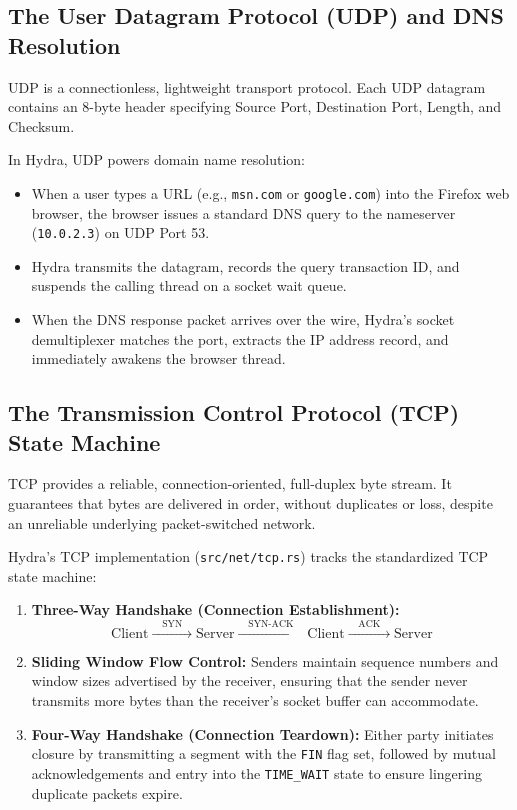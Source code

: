 \subsection{The User Datagram Protocol (UDP) and DNS Resolution}
UDP is a connectionless, lightweight transport protocol. Each UDP datagram contains an 8-byte header specifying Source Port, Destination Port, Length, and Checksum.

In Hydra, UDP powers domain name resolution:
\begin{itemize}
    \item When a user types a URL (e.g., \texttt{msn.com} or \texttt{google.com}) into the Firefox web browser, the browser issues a standard DNS query to the nameserver (\texttt{10.0.2.3}) on UDP Port 53.
    \item Hydra transmits the datagram, records the query transaction ID, and suspends the calling thread on a socket wait queue.
    \item When the DNS response packet arrives over the wire, Hydra's socket demultiplexer matches the port, extracts the IP address record, and immediately awakens the browser thread.
\end{itemize}

\subsection{The Transmission Control Protocol (TCP) State Machine}
TCP provides a reliable, connection-oriented, full-duplex byte stream. It guarantees that bytes are delivered in order, without duplicates or loss, despite an unreliable underlying packet-switched network.

Hydra's TCP implementation (\texttt{src/net/tcp.rs}) tracks the standardized TCP state machine:
\begin{enumerate}
    \item \textbf{Three-Way Handshake (Connection Establishment):}
    \begin{equation}
        \text{Client} \xrightarrow{\quad\text{SYN}\quad} \text{Server} \xrightarrow{\quad\text{SYN-ACK}\quad} \text{Client} \xrightarrow{\quad\text{ACK}\quad} \text{Server}
    \end{equation}
    \item \textbf{Sliding Window Flow Control:} Senders maintain sequence numbers and window sizes advertised by the receiver, ensuring that the sender never transmits more bytes than the receiver's socket buffer can accommodate.
    \item \textbf{Four-Way Handshake (Connection Teardown):} Either party initiates closure by transmitting a segment with the \texttt{FIN} flag set, followed by mutual acknowledgements and entry into the \texttt{TIME\_WAIT} state to ensure lingering duplicate packets expire.
\end{enumerate}

